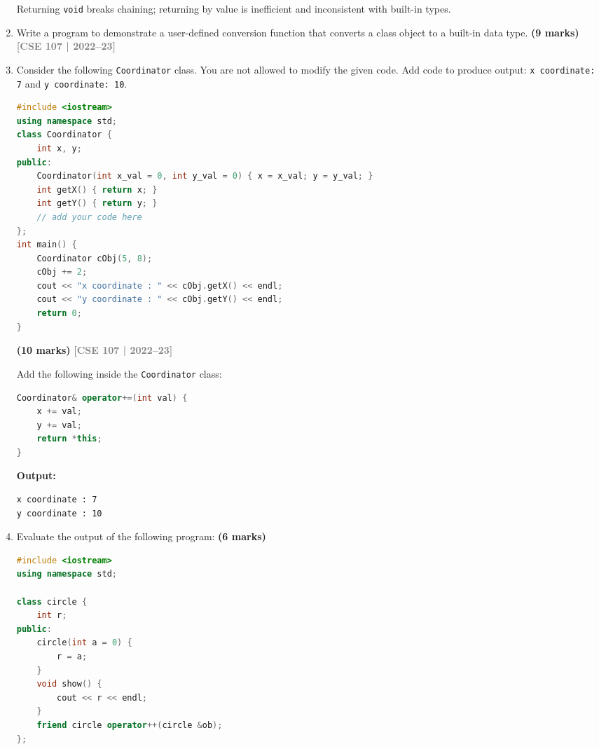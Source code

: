 \documentclass[12pt,a3paper]{article}
\newcommand{\yr}[1]{\hfill\textcolor{gray}{\small\textbf{[#1]}}}
\newcommand{\mk}[1]{\textcolor{orange!70!black}{\small\textbf{(#1 marks)}}}
\begin{document}
\begin{enumerate}
\begin{tcolorbox}[enhanced,breakable,ansbox,colback=cF!4,colframe=cF,
  boxrule=0.8pt,arc=5pt,
  title={\textbf{Answer --- Should overloaded = return same type?}},
  fonttitle=\bfseries\color{white},colbacktitle=cF]
Returning \texttt{void} breaks chaining; returning by value is
inefficient and inconsistent with built-in types.

\end{tcolorbox}


\item Write a program to demonstrate a user-defined conversion function that converts a class object to a built-in data type. \mk{9}
\yr{CSE 107 | 2022--23}


\item Consider the following \texttt{Coordinator} class. You are not allowed to modify the given code. Add code to produce output: \texttt{x coordinate: 7} and \texttt{y coordinate: 10}.
\begin{lstlisting}[language=C++]
#include <iostream>
using namespace std;
class Coordinator {
    int x, y;
public:
    Coordinator(int x_val = 0, int y_val = 0) { x = x_val; y = y_val; }
    int getX() { return x; }
    int getY() { return y; }
    // add your code here
};
int main() {
    Coordinator cObj(5, 8);
    cObj += 2;
    cout << "x coordinate : " << cObj.getX() << endl;
    cout << "y coordinate : " << cObj.getY() << endl;
    return 0;
}
\end{lstlisting}
\mk{10}
\yr{CSE 107 | 2022--23}


\begin{tcolorbox}[enhanced,breakable,ansbox,colback=cF!4,colframe=cF,
  boxrule=0.8pt,arc=5pt,
  title={\textbf{Answer --- Coordinator += to produce x=7, y=10}},
  fonttitle=\bfseries\color{white},colbacktitle=cF]

Add the following inside the \texttt{Coordinator} class:
\begin{lstlisting}[language=C++]
Coordinator& operator+=(int val) {
    x += val;
    y += val;
    return *this;
}
\end{lstlisting}

\textbf{Output:}
\begin{lstlisting}
x coordinate : 7
y coordinate : 10
\end{lstlisting}

\end{tcolorbox}


\item Evaluate the output of the following program: \mk{6}
\begin{lstlisting}[language=C++]
#include <iostream>
using namespace std;

class circle {
    int r;
public:
    circle(int a = 0) { 
        r = a; 
    }
    void show() { 
        cout << r << endl; 
    }
    friend circle operator++(circle &ob);
};


\end{lstlisting}
\end{enumerate}
\end{document}
